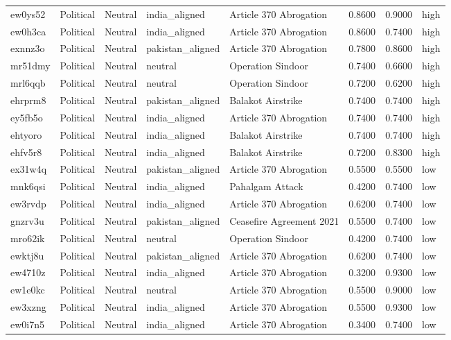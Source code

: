 \begin{longtable}{lllllrrl}
ew0ys52 & Political & Neutral & india\_aligned & Article 370 Abrogation & 0.8600 & 0.9000 & high \\
ew0h3ca & Political & Neutral & india\_aligned & Article 370 Abrogation & 0.8600 & 0.7400 & high \\
exnnz3o & Political & Neutral & pakistan\_aligned & Article 370 Abrogation & 0.7800 & 0.8600 & high \\
mr51dmy & Political & Neutral & neutral & Operation Sindoor & 0.7400 & 0.6600 & high \\
mrl6qqb & Political & Neutral & neutral & Operation Sindoor & 0.7200 & 0.6200 & high \\
ehrprm8 & Political & Neutral & pakistan\_aligned & Balakot Airstrike & 0.7400 & 0.7400 & high \\
ey5fb5o & Political & Neutral & india\_aligned & Article 370 Abrogation & 0.7400 & 0.7400 & high \\
ehtyoro & Political & Neutral & india\_aligned & Balakot Airstrike & 0.7400 & 0.7400 & high \\
ehfv5r8 & Political & Neutral & india\_aligned & Balakot Airstrike & 0.7200 & 0.8300 & high \\
ex31w4q & Political & Neutral & pakistan\_aligned & Article 370 Abrogation & 0.5500 & 0.5500 & low \\
mnk6qsi & Political & Neutral & india\_aligned & Pahalgam Attack & 0.4200 & 0.7400 & low \\
ew3rvdp & Political & Neutral & india\_aligned & Article 370 Abrogation & 0.6200 & 0.7400 & low \\
gnzrv3u & Political & Neutral & pakistan\_aligned & Ceasefire Agreement 2021 & 0.5500 & 0.7400 & low \\
mro62ik & Political & Neutral & neutral & Operation Sindoor & 0.4200 & 0.7400 & low \\
ewktj8u & Political & Neutral & pakistan\_aligned & Article 370 Abrogation & 0.6200 & 0.7400 & low \\
ew4710z & Political & Neutral & india\_aligned & Article 370 Abrogation & 0.3200 & 0.9300 & low \\
ew1e0kc & Political & Neutral & neutral & Article 370 Abrogation & 0.5500 & 0.9000 & low \\
ew3xzng & Political & Neutral & india\_aligned & Article 370 Abrogation & 0.5500 & 0.9300 & low \\
ew0i7n5 & Political & Neutral & india\_aligned & Article 370 Abrogation & 0.3400 & 0.7400 & low \\

\end{longtable}
